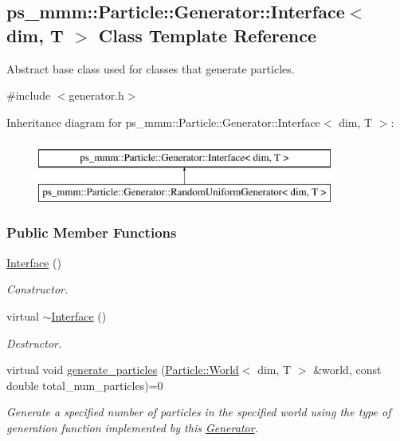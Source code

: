 \hypertarget{classps__mmm_1_1_particle_1_1_generator_1_1_interface}{}\subsection{ps\+\_\+mmm\+:\+:Particle\+:\+:Generator\+:\+:Interface$<$ dim, T $>$ Class Template Reference}
\label{classps__mmm_1_1_particle_1_1_generator_1_1_interface}


Abstract base class used for classes that generate particles.  




{\ttfamily \#include $<$generator.\+h$>$}

Inheritance diagram for ps\+\_\+mmm\+:\+:Particle\+:\+:Generator\+:\+:Interface$<$ dim, T $>$\+:\begin{figure}[H]
\begin{center}
\leavevmode
\includegraphics[height=2.000000cm]{classps__mmm_1_1_particle_1_1_generator_1_1_interface}
\end{center}
\end{figure}
\subsubsection*{Public Member Functions}
\begin{DoxyCompactItemize}
\item 
\hyperlink{classps__mmm_1_1_particle_1_1_generator_1_1_interface_a1adf5ff14443557eeb1b1ff02b76ec60}{Interface} ()
\begin{DoxyCompactList}\small\item\em Constructor. \end{DoxyCompactList}\item 
virtual \hyperlink{classps__mmm_1_1_particle_1_1_generator_1_1_interface_aa5986d3cf735f41d53513bba0900e681}{$\sim$\+Interface} ()
\begin{DoxyCompactList}\small\item\em Destructor. \end{DoxyCompactList}\item 
virtual void \hyperlink{classps__mmm_1_1_particle_1_1_generator_1_1_interface_af5e1063d3042cd3244ffcfcdfe86757c}{generate\+\_\+particles} (\hyperlink{classps__mmm_1_1_particle_1_1_world}{Particle\+::\+World}$<$ dim, T $>$ \&world, const double total\+\_\+num\+\_\+particles)=0
\begin{DoxyCompactList}\small\item\em Generate a specified number of particles in the specified world using the type of generation function implemented by this \hyperlink{namespaceps__mmm_1_1_particle_1_1_generator}{Generator}. \end{DoxyCompactList}\end{DoxyCompactItemize}


